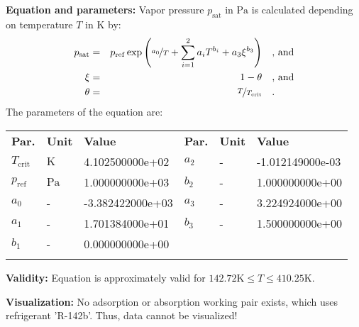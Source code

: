 \textbf{Equation and parameters:}
\newline
%
Vapor pressure $p_\mathrm{sat}$ in $\si{\pascal}$ is calculated depending on temperature $T$ in $\si{\kelvin}$ by:
%
\begin{equation*}
\begin{split}
p_\mathrm{sat} &=& p_\mathrm{ref} \exp \left( \nicefrac{a_0}{T} + \sum_{i=1}^{2} a_i T^{b_i} + a_3 \xi^{b_3} \right) & \quad\text{, and} \\
\xi &=& 1 - \theta & \quad\text{, and} \\
\theta &=& \nicefrac{T}{T_\mathrm{crit}} & \quad\text{.}
\end{split}
\end{equation*}
%
The parameters of the equation are:
%
\begin{longtable}[l]{lll|lll}
\toprule
\addlinespace
\textbf{Par.} & \textbf{Unit} & \textbf{Value} &	\textbf{Par.} & \textbf{Unit} & \textbf{Value} \\
\addlinespace
\midrule
\endhead

\bottomrule
\endfoot
\bottomrule
\endlastfoot
\addlinespace

$T_\mathrm{crit}$ & $\si{\kelvin}$ & 4.102500000e+02 & $a_2$ & - & -1.012149000e-03 \\
$p_\mathrm{ref}$ & $\si{\pascal}$ & 1.000000000e+03 & $b_2$ & - & 1.000000000e+00 \\
$a_0$ & - & -3.382422000e+03 & $a_3$ & - & 3.224924000e+00 \\
$a_1$ & - & 1.701384000e+01 & $b_3$ & - & 1.500000000e+00 \\
$b_1$ & - & 0.000000000e+00 & & & \\

\addlinespace\end{longtable}

\textbf{Validity:}
\newline
Equation is approximately valid for $142.72 \si{\kelvin} \leq T \leq 410.25 \si{\kelvin}$.
\newline

\textbf{Visualization:}
%
\newline
No adsorption or absorption working pair exists, which uses refrigerant 'R-142b'. Thus, data cannot be visualized!
%

\FloatBarrier
\newpage
